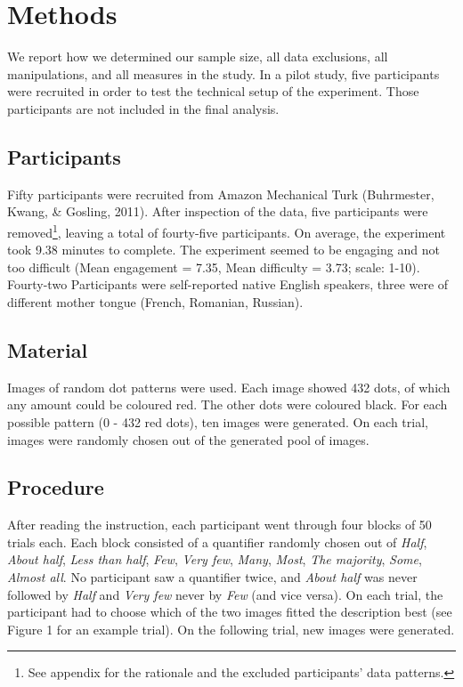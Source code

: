 \documentclass[english,floatsintext,man]{apa6}
\begin{document}
\section{Methods}\label{methods}

We report how we determined our sample size, all data exclusions, all
manipulations, and all measures in the study. In a pilot study, five
participants were recruited in order to test the technical setup of the
experiment. Those participants are not included in the final analysis.

\subsection{Participants}\label{participants}

Fifty participants were recruited from Amazon Mechanical Turk
(Buhrmester, Kwang, \& Gosling, 2011). After inspection of the data,
five participants were
removed\footnote{See appendix for the rationale and the excluded participants' data patterns.},
leaving a total of fourty-five participants. On average, the experiment
took 9.38 minutes to complete. The experiment seemed to be engaging and
not too difficult (Mean engagement = 7.35, Mean difficulty = 3.73;
scale: 1-10). Fourty-two Participants were self-reported native English
speakers, three were of different mother tongue (French, Romanian,
Russian).

\subsection{Material}\label{material}

Images of random dot patterns were used. Each image showed 432 dots, of
which any amount could be coloured red. The other dots were coloured
black. For each possible pattern (0 - 432 red dots), ten images were
generated. On each trial, images were randomly chosen out of the
generated pool of images.

\subsection{Procedure}\label{procedure}

After reading the instruction, each participant went through four blocks
of 50 trials each. Each block consisted of a quantifier randomly chosen
out of \emph{Half}, \emph{About half}, \emph{Less than half},
\emph{Few}, \emph{Very few}, \emph{Many}, \emph{Most}, \emph{The
majority}, \emph{Some}, \emph{Almost all}. No participant saw a
quantifier twice, and \emph{About half} was never followed by
\emph{Half} and \emph{Very few} never by \emph{Few} (and vice versa). On
each trial, the participant had to choose which of the two images fitted
the description best (see Figure 1 for an example trial). On the
following trial, new images were generated.
\end{document}
